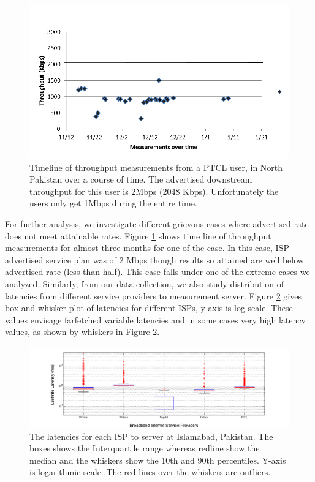 \documentclass{sig-alternate-10pt}
\begin{document}
\begin{sloppypar}
\begin{figure}[t!]
\begin {center}
   \includegraphics[height=0.2 \textheight,width=0.5 \textwidth]{3.png}
   \end {center}
 \caption{Timeline of throughput measurements from a PTCL user, in North Pakistan over a course of time. The advertised downstream throughput for this user is 2Mbps (2048 Kbps). Unfortunately the users only get 1Mbps during the entire time.}
 \label{Fig:3}
\end{figure}

\indent For further analysis, we investigate different grievous cases where advertised rate does not meet attainable rates. Figure \ref{Fig:3} shows time line of throughput measurements for almost three months for one of the case. In this case, ISP advertised service plan was of 2 Mbps though results so attained are well below advertised rate (less than half).  This case falls under one of the extreme cases we analyzed.
 Similarly, from our data collection, we also study distribution of latencies from different service providers to measurement server. Figure \ref{Fig:4} gives box and whisker plot of latencies for different ISPs, y-axis is log scale. These values envisage farfetched variable latencies and in some cases very high latency values, as shown by whiskers in Figure \ref{Fig:4}.

\begin{figure}[t!]
\begin {center}
   \includegraphics[height=0.2 \textheight,width=0.5 \textwidth]{4.png}
   \end {center}
 \caption{The latencies for each ISP to server at Islamabad, Pakistan. The boxes shows the Interquartile range whereas redline show the median and the whiskers show the 10th and 90th percentiles. Y-axis is logarithmic scale. The red lines over the whiskers are outliers.}
 \label{Fig:4}
\end{figure}


\end{sloppypar}
\end{document}

